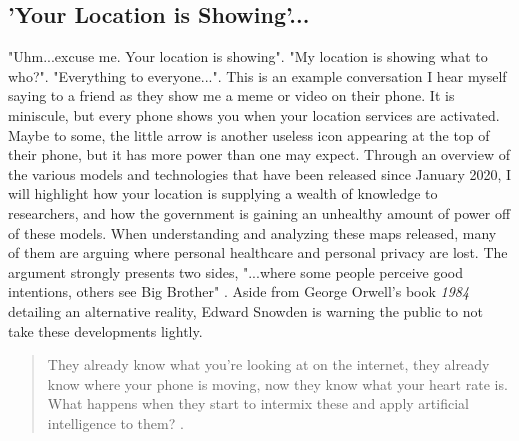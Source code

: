 \documentclass[12pt]{article}
\begin{document}
\subsection*{'Your Location is Showing'...}
"Uhm...excuse me. Your location is showing". "My location is showing what to who?". "Everything to everyone...". This is an example conversation I hear myself saying to a friend as they show me a meme or video on their phone. It is miniscule, but 
every phone shows you when your location services are activated. Maybe to some, the little arrow is another useless icon appearing at the top of their phone, but it has more power
than one may expect. Through an overview of the various models and technologies that have been released since January 2020, I will highlight how your location is supplying a wealth of 
knowledge to researchers, and how the government is gaining an unhealthy amount of power off of these models. When understanding and analyzing these maps released, many of them are arguing
where personal healthcare and personal privacy are lost. The argument strongly presents two sides, "...where some people perceive good intentions, others see Big Brother" \cite{kim_denyer_2020}. 
Aside from George Orwell's book \textit{1984} detailing an alternative reality, Edward Snowden is warning the public to not take these developments lightly.
\begin{quotation}
They already know what you're looking at on the internet, they already know where your phone is moving, now they 
know what your heart rate is. What happens when they start to intermix these and apply artificial intelligence to them? \cite{chandler_2020}.
\end{quotation} 
\end{document}
